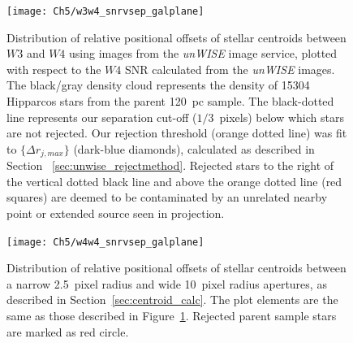     \begin{figure}
    \centering
    \texttt{[image: Ch5/w3w4\_snrvsep\_galplane]}
    \caption[Rejected \textit{unWISE} stars using $W3$ to $W4$ offsets]{Distribution of relative positional offsets of stellar centroids between $W3$ and $W4$ using images from the \textit{unWISE} image service, plotted with respect to the $W4$ SNR calculated from the \textit{unWISE} images. The black/gray density cloud represents the density of 15304 Hipparcos stars from the parent 120~pc sample. The black-dotted line represents our separation cut-off ($1/3$~pixels) below which stars are not rejected. Our rejection threshold (orange dotted line) was fit to $\{\Delta r_{j,max}\}$ (dark-blue diamonds), calculated as described in Section~ \ref{sec:unwise_rejectmethod}. Rejected stars to the right of the vertical dotted black line and above the orange dotted line (red squares) are deemed to be contaminated by an unrelated nearby point or extended source seen in projection.}
    \label{fig:unwise_w3w4}
    \end{figure}


    \begin{figure}
    \centering
    \texttt{[image: Ch5/w4w4\_snrvsep\_galplane]}
    \caption[Rejected \textit{unWISE} stars using $W4$ to $W4$ offsets]{Distribution of relative positional offsets of stellar centroids between a narrow 2.5~pixel radius and wide 10~pixel radius apertures, as described in Section~\ref{sec:centroid_calc}. The plot elements are the same as those described in Figure~\ref{fig:unwise_w3w4}. Rejected parent sample stars are marked as red circle.}
    \label{fig:unwise_w4w4}
    \end{figure}
    
